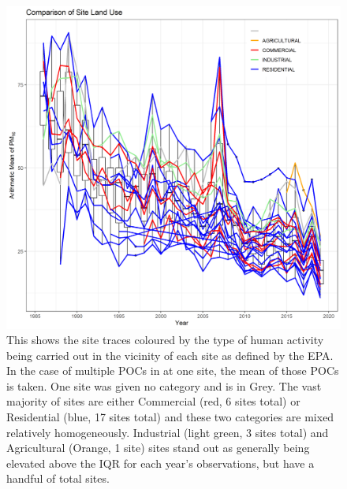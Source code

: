 \documentclass{article}
\begin{document}
\begin{figure}[ht]
	\centering
	\includegraphics[width = \textwidth]{Figures/SOCAB_metadata_Site_Land_use.png}
	\caption{This shows the site traces coloured by the type of human activity being carried out in the vicinity of each site as defined by the EPA.  In the case of multiple \ac{POC}s in at one site, the mean of those \ac{POC}s is taken.  One site was given no category and is in Grey.  The vast majority of sites are either Commercial (red, 6 sites total) or Residential (blue, 17 sites total) and these two categories are mixed relatively homogeneously.  Industrial (light green, 3 sites total) and Agricultural (Orange, 1 site) sites stand out as generally being elevated above the IQR for each year's observations, but have a handful of total sites.}
	\label{fig:SOCAB_metadata_Site_Land_use}
\end{figure}
\end{document}
